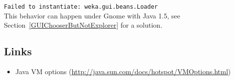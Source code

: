 \verb=Failed to instantiate: weka.gui.beans.Loader=\\

\noindent This behavior can happen under Gnome with Java 1.5, see
Section~\ref{GUIChooserButNotExplorer} for a solution.

\subsection{Links}
\begin{itemize}
\item Java VM options (\url{http://java.sun.com/docs/hotspot/VMOptions.html}{})
\end{itemize}



